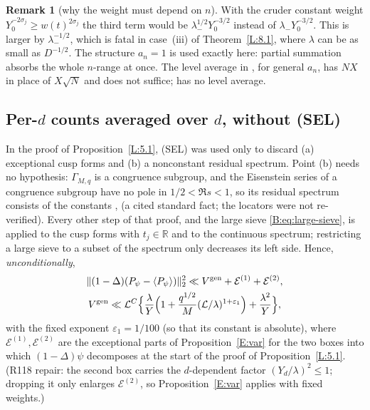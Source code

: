 \documentclass[10pt,reqno]{amsart}
\theoremstyle{definition}
\newtheorem{remark}[theorem]{Remark}
\numberwithin{equation}{section}
\newcommand{\R}{\mathbb R}
\newcommand{\cL}{\mathcal L}
\begin{document}
\begin{remark}[why the weight must depend on $n$]\label{E:rem-weight}
With the cruder constant weight $Y_0^{-2\sigma_j}\ge w(t)^{2\sigma_j}$ the
third term would be $\lambda_-^{1/2}Y_0^{-3/2}$ instead of
$\lambda_-Y_0^{-3/2}$. This is larger by $\lambda_-^{-1/2}$, which is fatal in
case~(iii) of Theorem~\ref{L:8.1}, where $\lambda$ can be as small as
$D^{-1/2}$. The structure $a_n=1$ is used exactly here: partial
summation absorbs the whole $n$-range at once. The level average in
\cite[Theorem~6]{DI}, for general $a_n$, has $NX$ in place of $X\sqrt N$
and does not suffice; \cite[Theorem~5]{DI} has no level average.
\end{remark}

\subsection*{Per-\texorpdfstring{$d$}{d} counts averaged over \texorpdfstring{$d$}{d}, without (SEL)}
In the proof of Proposition~\ref{L:5.1}, (SEL) was used only to discard
(a) exceptional cusp forms and (b) a nonconstant residual spectrum.
Point (b) needs no hypothesis: $\Gamma_{M,q}$ is a congruence subgroup, and
the Eisenstein series of a congruence subgroup have no pole in
$1/2<\Re s<1$, so its residual spectrum consists of the constants
\cite[\S11]{Iw}, \cite{Hux} (a cited standard fact; the locators were not
re-verified). Every other step of that proof, and the large sieve
\eqref{B:eq:large-sieve}, is applied to the cusp forms with $t_j\in\R$ and
to the continuous spectrum; restricting a large sieve to a subset of the
spectrum only decreases its left side. Hence, \emph{unconditionally},
\begin{equation}\label{E:eq:gen}
 \begin{gathered}
 \|(1-\Delta)(P_\psi-\langle P_\psi\rangle)\|_2^2
 \ll V^{\rm gen}+\mathcal E^{(1)}+\mathcal E^{(2)},\\
 V^{\rm gen}\ll\cL^C\Bigl\{\frac\lambda Y\Bigl(1+\frac{q^{1/2}}M
 (\cL/\lambda)^{1+\varepsilon_1}\Bigr)+\frac{\lambda^2}Y\Bigr\},
 \end{gathered}
\end{equation}
with the fixed exponent $\varepsilon_1=1/100$ (so that its constant is
absolute), where $\mathcal E^{(1)},\mathcal E^{(2)}$ are the exceptional parts
of Proposition~\ref{E:var} for the two boxes into which
$(1-\Delta)\psi$ decomposes at the start of the proof of
Proposition~\ref{L:5.1}. (R118 repair: the second box carries the
$d$-dependent factor $(Y_d/\lambda)^2\le1$; dropping it only enlarges
$\mathcal E^{(2)}$, so Proposition~\ref{E:var} applies with fixed weights.)
\end{document}
